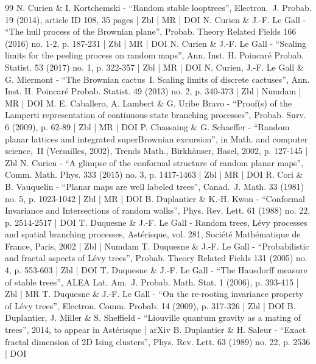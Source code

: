 \begin{thebibliography}{99}
N. Curien \& I. Kortchemski - “Random stable looptrees”, Electron. J. Probab. 19 (2014), article ID 108, 35 pages | Zbl | MR | DOI
N. Curien \& J.-F. Le Gall - “The hull process of the Brownian plane”, Probab. Theory Related Fields 166 (2016) no. 1-2, p. 187-231 | Zbl | MR | DOI
N. Curien \& J.-F. Le Gall - “Scaling limits for the peeling process on random maps”, Ann. Inst. H. Poincaré Probab. Statist. 53 (2017) no. 1, p. 322-357 | Zbl | MR | DOI
N. Curien, J.-F. Le Gall \& G. Miermont - “The Brownian cactus I. Scaling limits of discrete cactuses”, Ann. Inst. H. Poincaré Probab. Statist. 49 (2013) no. 2, p. 340-373 | Zbl | Numdam | MR | DOI
M. E. Caballero, A. Lambert \& G. Uribe Bravo - “Proof(s) of the Lamperti representation of continuous-state branching processes”, Probab. Surv. 6 (2009), p. 62-89 | Zbl | MR | DOI
P. Chassaing \& G. Schaeffer - “Random planar lattices and integrated superBrownian excursion”, in Math. and computer science, II (Versailles, 2002), Trends Math., Birkhäuser, Basel, 2002, p. 127-145 | Zbl
N. Curien - “A glimpse of the conformal structure of random planar maps”, Comm. Math. Phys. 333 (2015) no. 3, p. 1417-1463 | Zbl | MR | DOI
R. Cori \& B. Vauquelin - “Planar maps are well labeled trees”, Canad. J. Math. 33 (1981) no. 5, p. 1023-1042 | Zbl | MR | DOI
B. Duplantier \& K.-H. Kwon - “Conformal Invariance and Intersections of random walks”, Phys. Rev. Lett. 61 (1988) no. 22, p. 2514-2517 | DOI
T. Duquesne \& J.-F. Le Gall - Random trees, Lévy processes and spatial branching processes, Astérisque, vol. 281, Société Mathématique de France, Paris, 2002 | Zbl | Numdam
T. Duquesne \& J.-F. Le Gall - “Probabilistic and fractal aspects of Lévy trees”, Probab. Theory Related Fields 131 (2005) no. 4, p. 553-603 | Zbl | DOI
T. Duquesne \& J.-F. Le Gall - “The Hausdorff measure of stable trees”, ALEA Lat. Am. J. Probab. Math. Stat. 1 (2006), p. 393-415 | Zbl | MR
T. Duquesne \& J.-F. Le Gall - “On the re-rooting invariance property of Lévy trees”, Electron. Comm. Probab. 14 (2009), p. 317-326 | Zbl | DOI
B. Duplantier, J. Miller \& S. Sheffield - “Liouville quantum gravity as a mating of trees”, 2014, to appear in Astérisque | arXiv
B. Duplantier \& H. Saleur - “Exact fractal dimension of 2D Ising clusters”, Phys. Rev. Lett. 63 (1989) no. 22, p. 2536 | DOI

\end{thebibliography}
